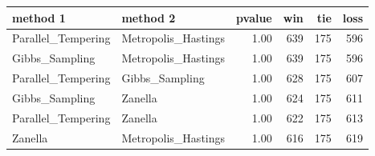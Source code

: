 \begin{table}[ht]
\centering
\begin{tabular}{llrrrr}
  \hline
method 1 & method 2 & pvalue & win & tie & loss \\ 
  \hline
Parallel\_Tempering & Metropolis\_Hastings & 1.00 & 639 & 175 & 596 \\ 
  Gibbs\_Sampling & Metropolis\_Hastings & 1.00 & 639 & 175 & 596 \\ 
  Parallel\_Tempering & Gibbs\_Sampling & 1.00 & 628 & 175 & 607 \\ 
  Gibbs\_Sampling & Zanella & 1.00 & 624 & 175 & 611 \\ 
  Parallel\_Tempering & Zanella & 1.00 & 622 & 175 & 613 \\ 
  Zanella & Metropolis\_Hastings & 1.00 & 616 & 175 & 619 \\ 
   \hline
\end{tabular}
\end{table}
